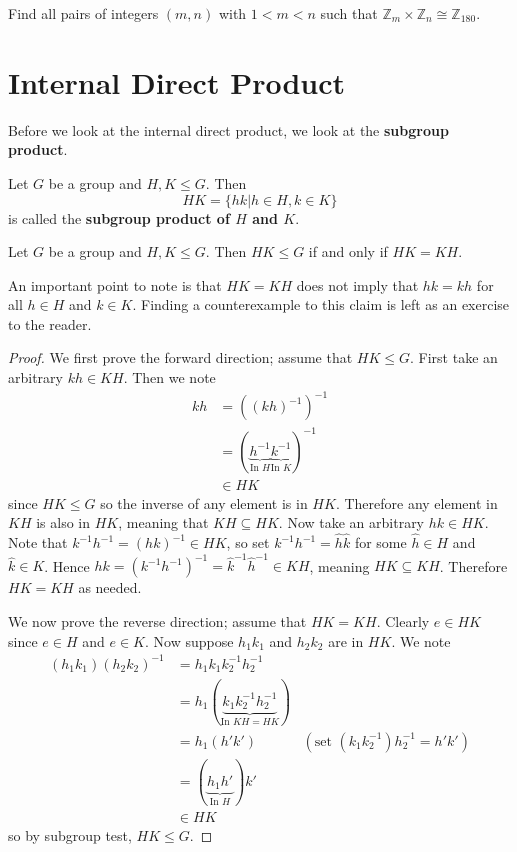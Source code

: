\begin{exercise}
    Find all pairs of integers $(m, n)$ with $1 < m < n$ such that $\mathbb{Z}_m \times \mathbb{Z}_n \cong \mathbb{Z}_{180}$.
\end{exercise}

\section{Internal Direct Product}
Before we look at the internal direct product, we look at the \textbf{subgroup product}.
\begin{definition}
    Let $G$ be a group and $H, K \leq G$. Then
    \[
        HK = \{hk \vert h \in H, k \in K\}
    \]
    is called the \textbf{subgroup product of $H$ and $K$}.
\end{definition}

\begin{proposition}\label{prop-subgroup-product-is-subgroup}
    Let $G$ be a group and $H, K \leq G$. Then $HK \leq G$ if and only if $HK = KH$.
\end{proposition}

An important point to note is that $HK = KH$ does not imply that $hk = kh$ for all $h \in H$ and $k \in K$. Finding a counterexample to this claim is left as an exercise to the reader.

\begin{proof}
    We first prove the forward direction; assume that $HK \leq G$. First take an arbitrary $kh \in KH$. Then we note
    \begin{align*}
        kh &= \left(\left(kh\right)^{-1}\right)^{-1}\\
        &= (\underbrace{h^{-1}}_{\text{In } H}\underbrace{k^{-1}}_{\text{In } K})^{-1}\\
        &\in HK
    \end{align*}
    since $HK \leq G$ so the inverse of any element is in $HK$. Therefore any element in $KH$ is also in $HK$, meaning that $KH \subseteq HK$. Now take an arbitrary $hk \in HK$. Note that $k^{-1}h^{-1} = (hk)^{-1} \in HK$, so set $k^{-1}h^{-1} = \hat{h}\hat{k}$ for some $\hat{h} \in H$ and $\hat{k} \in K$. Hence $hk = \left(k^{-1}h^{-1}\right)^{-1} = \hat{k}^{-1}\hat{h}^{-1} \in KH$, meaning $HK \subseteq KH$. Therefore $HK = KH$ as needed.

    We now prove the reverse direction; assume that $HK = KH$. Clearly $e \in HK$ since $e \in H$ and $e \in K$. Now suppose $h_1k_1$ and $h_2k_2$ are in $HK$. We note
    \begin{align*}
        (h_1k_1)(h_2k_2)^{-1} &= h_1k_1k_2^{-1}h_2^{-1}\\
        &= h_1(\underbrace{k_1k_2^{-1}h_2^{-1}}_{\text{In } KH = HK})\\
        &= h_1(h'k') & (\text{set }(k_1k_2^{-1})h_2^{-1} = h'k')\\
        &= (\underbrace{h_1h'}_{\text{In } H})k'\\
        &\in HK
    \end{align*}
    so by subgroup test, $HK \leq G$.
\end{proof}

